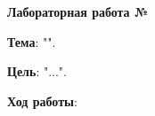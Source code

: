 \begin{ESKDtitlePage}
    \tableofcontents 
    \newpage
\end{ESKDtitlePage}

\begin{center}
    \textbf{Лабораторная работа №\titlePageLabNumber}
\end{center}

\textbf{Тема}: "\titlePageTopic".

\textbf{Цель}: "...".

\begin{center}
    \textbf{Ход работы}:
\end{center}

\newpage





